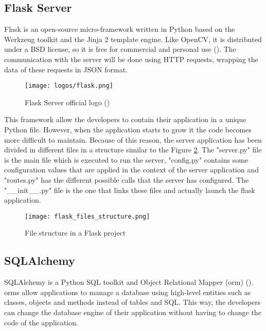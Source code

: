 	\subsection{Flask Server}
	Flask is an open-source micro-framework written in Python based on the Werkzeug toolkit and the Jinja 2 template engine. Like OpenCV, it is distributed under a BSD license, so it is free for commercial and personal use (\cite{flask_server_docs}). The communication with the server will be done using HTTP requests, wrapping the data of these requests in JSON format.

	\begin{figure}[!ht]
		\centering
		\texttt{[image: logos/flask.png]}
		\caption{Flask Server official logo (\cite{flask_server_docs})}
		\label{fig:flask_server}
	\end{figure}	

	This framework allow the developers to contain their application in a unique Python file. However, when the application starts to grow it the code becomes more difficult to maintain. Because of this reason, the server application has been divided in different files in a structure similar to the Figure \ref{fig:flask_files_struct}. The "server.py" file is the main file which is executed to run the server, "config.py" contains some configuration values that are applied in the context of the server application and "routes.py" has the different possible calls that the server has configured. The "{\_}{\_}init{\_}{\_}.py" file is the one that links these files and actually launch the flask application.

	\begin{figure}[!ht]
		\centering
		\texttt{[image: flask\_files\_structure.png]}
		\caption{File structure in a Flask project}
		\label{fig:flask_files_struct}
	\end{figure}		

	\subsection{SQLAlchemy}
	\label{subsec:sql_alchemy}
	SQLAlchemy is a Python SQL toolkit and Object Relational Mapper (\gls{orm}) (\cite{sqlalchemy_main_website}). \glspl{orm} allow applications to manage a database using high-level entities such as classes, objects and methods instead of tables and SQL. This way, the developers can change the database engine of their application without having to change the code of the application. 

